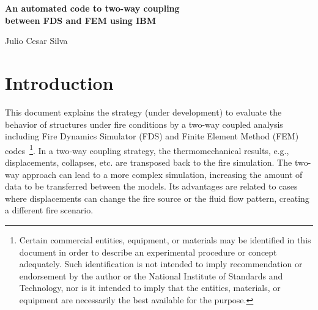 \documentclass[11pt]{book}
\begin{document}

\pagestyle{empty}

\begin{minipage}[t][9in][s]{6.5in}

\begin{flushright}
\fontsize{20}{24}\selectfont
\bf{
An automated code to two-way coupling \\
between FDS and FEM using IBM \\
}
\end{flushright}
\begin{flushright}
\fontsize{14}{16}\selectfont
{
Julio Cesar Silva  
}

\end{flushright}


\end{minipage}

\newpage

\newpage

\frontmatter

\pagestyle{plain}

\cleardoublepage
{}
\tableofcontents

\mainmatter


\chapter{Introduction}
\label{info:intro}

This document explains the strategy (under development) to evaluate the behavior of structures under fire conditions by a two-way coupled analysis including Fire Dynamics Simulator (FDS\cite{FDS_Users_Guide}) and Finite Element Method (FEM) codes~\footnote{Certain commercial entities, equipment, or materials may be identified in this document in order to describe an experimental procedure or concept adequately. Such identification is not intended to imply recommendation or endorsement by the author or the National Institute of Standards and Technology, nor is it intended to imply that the entities, materials, or equipment are necessarily the best available for the purpose.}. In a two-way coupling strategy, the thermomechanical results, e.g., displacements, collapses, etc. are transposed back to the fire simulation. The two-way approach can lead to a more complex simulation, increasing the amount of data to be transferred between the models. Its advantages are related to cases where displacements can change the fire source or the fluid flow pattern, creating a different fire scenario. 
\end{document}
